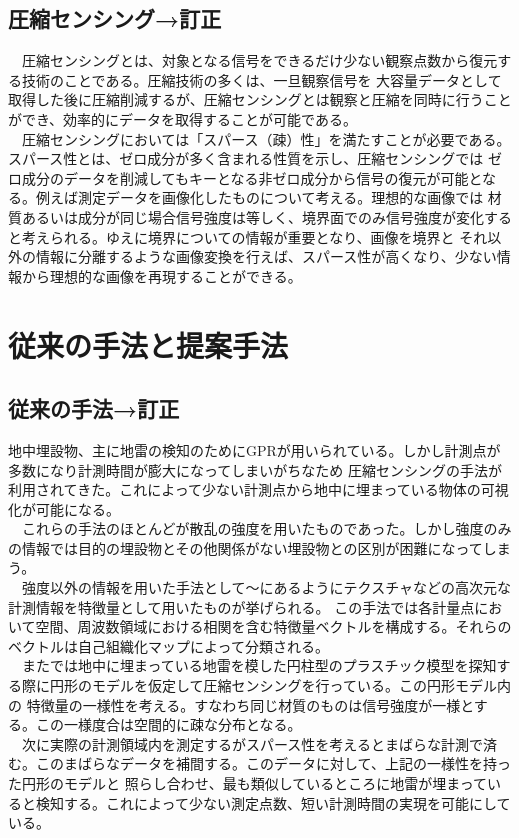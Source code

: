 \documentclass[a4paper,12pt]{jsreport}
\begin{document}
 \section{圧縮センシング→訂正}
　圧縮センシングとは、対象となる信号をできるだけ少ない観察点数から復元する技術のことである。圧縮技術の多くは、一旦観察信号を
大容量データとして取得した後に圧縮削減するが、圧縮センシングとは観察と圧縮を同時に行うことができ、効率的にデータを取得することが可能である。
\\　圧縮センシングにおいては「スパース（疎）性」を満たすことが必要である。スパース性とは、ゼロ成分が多く含まれる性質を示し、圧縮センシングでは
ゼロ成分のデータを削減してもキーとなる非ゼロ成分から信号の復元が可能となる。例えば測定データを画像化したものについて考える。理想的な画像では
材質あるいは成分が同じ場合信号強度は等しく、境界面でのみ信号強度が変化すると考えられる。ゆえに境界についての情報が重要となり、画像を境界と
それ以外の情報に分離するような画像変換を行えば、スパース性が高くなり、少ない情報から理想的な画像を再現することができる。


\chapter{従来の手法と提案手法}
\section{従来の手法→訂正}
地中埋設物、主に地雷の検知のためにGPRが用いられている。しかし計測点が多数になり計測時間が膨大になってしまいがちなため
圧縮センシングの手法が利用されてきた。これによって少ない計測点から地中に埋まっている物体の可視化が可能になる。
\\　これらの手法のほとんどが散乱の強度を用いたものであった。しかし強度のみの情報では目的の埋設物とその他関係がない埋設物との区別が困難になってしまう。
\\　強度以外の情報を用いた手法として\cite{hirose1}～\cite{hirose3}にあるようにテクスチャなどの高次元な計測情報を特徴量として用いたものが挙げられる。
この手法では各計量点において空間、周波数領域における相関を含む特徴量ベクトルを構成する。それらのベクトルは自己組織化マップによって分類される。
\\　また\cite{imai}では地中に埋まっている地雷を模した円柱型のプラスチック模型を探知する際に円形のモデルを仮定して圧縮センシングを行っている。この円形モデル内の
特徴量の一様性を考える。すなわち同じ材質のものは信号強度が一様とする。この一様度合は空間的に疎な分布となる。
\\　次に実際の計測領域内を測定するがスパース性を考えるとまばらな計測で済む。このまばらなデータを補間する。このデータに対して、上記の一様性を持った円形のモデルと
照らし合わせ、最も類似しているところに地雷が埋まっていると検知する。これによって少ない測定点数、短い計測時間の実現を可能にしている。
\end{document}
